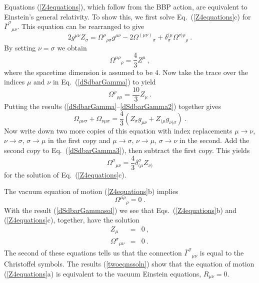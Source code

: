 \documentclass[letterpaper,nofootinbib,prd,amsmath,twocolumn]{revtex4-1}
\begin{document}
Equations (\ref{Z4equations}), which follow from the BBP action, 
are  equivalent to Einstein's general relativity. To show this, we first solve 
Eq.~(\ref{Z4equations}c) for $\bar\Gamma^\sigma{}_{\mu\nu}$. 
This equation can be rearranged to give
\begin{equation}\label{dSdbarGamma}
	2g^{\mu\nu} Z_\sigma = \Omega^\rho{}_{\rho\sigma} g^{\mu\nu} - 2\Omega^{(\mu\nu)}{}_\sigma 
	+ \delta^{(\mu}_\sigma \Omega^{\nu)\rho}{}_\rho  \ .
\end{equation}
By setting $\nu = \sigma$ we obtain  
\begin{equation}\label{dSdbarGamma1}
	\Omega^{\mu\rho}{}_\rho = \frac{4}{3} Z^\mu \ ,
\end{equation}
where the spacetime dimension is assumed to be 4. 
Now take the trace over the indices $\mu$ and $\nu$ in Eq.~(\ref{dSdbarGamma}) to yield 
\begin{equation}\label{dSdbarGamma2}
	\Omega^\rho{}_{\rho\mu} = \frac{10}{3} Z_\mu  \ .
\end{equation}
Putting the results (\ref{dSdbarGamma}--\ref{dSdbarGamma2}) together gives 
\begin{equation}\label{dSdbarGamma3}
	\Omega_{\mu\nu\sigma} + \Omega_{\nu\mu\sigma}  = \frac{4}{3} \left( Z_\sigma g_{\mu\nu} 
		+ Z_{(\mu} g_{\nu)\sigma} \right) \ .
\end{equation}
Now write down two more copies of this equation with index replacements $\mu\to\nu$, $\nu\to\sigma$, $\sigma\to\mu$ 
in the first copy and $\mu\to\sigma$, $\nu\to\mu$, $\sigma\to\nu$ in the second. Add the second copy to Eq.~(\ref{dSdbarGamma3}), 
then subtract the first copy.  This yields 
\begin{equation}\label{dSdbarGammasol}
	\Omega^\sigma{}_{\mu\nu} = \frac{4}{3} \delta^\sigma_{(\mu} Z_{\nu)} 
\end{equation} 
for the solution of Eq.~(\ref{Z4equations}c). 

The vacuum equation of motion (\ref{Z4equations}b) implies
\begin{equation}
	\Omega^{\mu\rho}{}_\rho = 0 \ .
\end{equation}
With the result (\ref{dSdbarGammasol}) we see that Eqs.~(\ref{Z4equations}b) and (\ref{Z4equations}c), together, 
have the solution 
\begin{subequations}\label{twoeqnssoln}
\begin{eqnarray}
	Z_\mu & = & 0 \ , \\
	\Omega^\sigma{}_{\mu\nu} & = & 0 \ .
\end{eqnarray}
\end{subequations}
The second of these equations tells us that the connection $\bar\Gamma^\sigma{}_{\mu\nu}$ is equal to the 
Christoffel symbols. The results (\ref{twoeqnssoln}) show that the  equation of motion
(\ref{Z4equations}a) is equivalent to the vacuum Einstein equations, $R_{\mu\nu} = 0$. 
\end{document}
